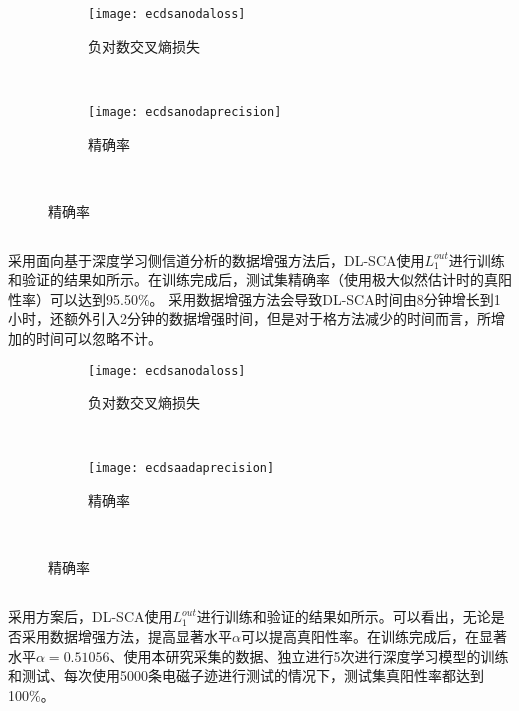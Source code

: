 {{	\begin{figure}[!h]
		\centering
		\begin{subfigure}[b]{\twof\textwidth}
			\texttt{[image: ecdsanodaloss]}
			\caption{负对数交叉熵损失}
			\label{fig:ecdsanodaloss}
		\end{subfigure}%
		~%
		\begin{subfigure}[b]{\twof\textwidth}
			\texttt{[image: ecdsanodaprecision]}
			\caption{精确率}
			\label{fig:ecdsanodaprecision}
		\end{subfigure}
		\\
		\label{fig:ecdsanoda}
	\end{figure}

	\subsection{\shujuzengqiang}
	
	采用面向基于深度学习侧信道分析的数据增强方法后，DL-SCA使用$L_1^{out}$进行训练和验证的结果如所示。在训练完成后，测试集精确率（使用极大似然估计时的真阳性率）可以达到95.50\%。%
	采用数据增强方法会导致DL-SCA时间由8分钟增长到1小时，还额外引入2分钟的数据增强时间，但是对于格方法减少的时间而言，所增加的时间可以忽略不计。
	
	\begin{figure}[!h]
		\centering
		\begin{subfigure}[b]{\twof\textwidth}
			\texttt{[image: ecdsanodaloss]}
			\caption{负对数交叉熵损失}
			\label{fig:ecdsaadaloss}
		\end{subfigure}%
		~%
		\begin{subfigure}[b]{\twof\textwidth}
			\texttt{[image: ecdsaadaprecision]}
			\caption{精确率}
			\label{fig:ecdsaadaprecision}
		\end{subfigure}
		\\
		\label{fig:ecdsaada}
	\end{figure}

	\subsection{\jiashejianyanguji}
	采用\jiashejianyanguji 方案后，DL-SCA使用$L_1^{out}$进行训练和验证的结果如所示。可以看出，无论是否采用数据增强方法，提高显著水平$\alpha$可以提高真阳性率。在训练完成后，在显著水平$\alpha=0.51056$、使用本研究采集的数据、独立进行5次进行深度学习模型的训练和测试、每次使用5000条电磁子迹进行测试的情况下，测试集真阳性率都达到100\%。%
	
}}

